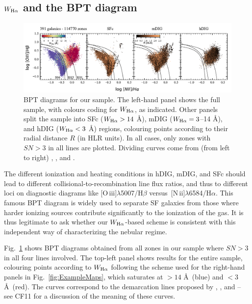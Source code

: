\documentclass[a4paper, fleqn, usenatbib, useAMS]{mnras}
\newcommand{\Ha}{\ifmmode {\rm H}\alpha \else H$\alpha$\fi\xspace}
\newcommand{\Hb}{\ifmmode {\rm H}\beta \else H$\beta$\fi\xspace}
\newcommand{\Nii}{[N\,{\sc ii}]$\lambda$6584}
\newcommand{\Oiii}{[O\,{\sc iii}]$\lambda$5007}
\begin{document}
\subsection{$W_{\Ha}$ and the BPT diagram}
\label{sec:BPT}

\begin{figure}
 \includegraphics{figs/fig_BPT_per_class.pdf}
 \caption{BPT diagrams for our sample. The left-hand panel shows the full sample, with colours coding for $W_{\Ha}$, as indicated. Other panels split the sample into SFc ($W_{\Ha} > 14$ \AA), mDIG ($W_{\Ha} = 3$--14 \AA), and hDIG ($W_{\Ha} < 3$ \AA) regions, colouring points according to their radial distance $R$ (in HLR units).  In all cases, only zones with $SN > 3$ in all lines are plotted. Dividing curves come from (from left to right) \citet[S06]{Stasinska.etal.2006a}, \citet[K03]{Kauffmann.etal.2003a}, and \citet[K01]{Kewley.etal.2001a}.
 }
 \label{fig:BPT}
\end{figure}

The different ionization and heating conditions in hDIG, mDIG, and SFc should lead to different collisional-to-recombination line flux ratios, and thus to different loci on diagnostic diagrams like \Oiii/\Hb versus\ \Nii/\Ha. This famous BPT diagram \citep*[after][]{Baldwin.Phillips.Terlevich.1981a} is widely used to separate SF galaxies from those where harder ionizing sources contribute significantly to the ionization of the gas. It is thus legitimate to ask whether our $W_{\Ha}$-based scheme is consistent with this independent way of characterizing the nebular regime.

Fig.\ \ref{fig:BPT} shows BPT diagrams obtained from all zones in our sample where $SN > 3$ in all four lines involved. The top-left panel shows results for the entire sample, colouring points according to $W_{\Ha}$ following the scheme used for the right-hand panels in Fig.\ \ref{fig:ExampleMaps}, which saturates at $> 14$ \AA\ (blue) and $< 3$ \AA\ (red). The curves correspond to the demarcation lines proposed by \citet[S06]{Stasinska.etal.2006a}, \citet[K03]{Kauffmann.etal.2003a}, and \citet[K01]{Kewley.etal.2001a} -- see CF11 for a discussion of the meaning of these curves.
\end{document}
